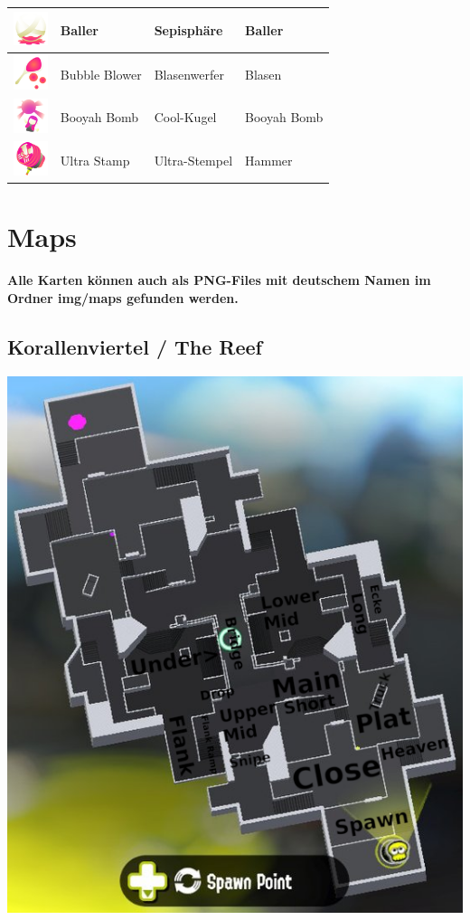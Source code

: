 \documentclass{scrreprt}
\begin{document}
\begin{center}
\begin{longtable}{|m{3.5cm}|m{4cm}|m{4cm}|m{2cm}|}
		\includegraphics[height=1cm]{img/baller.png} & Baller & Sepisphäre & Baller \\ \hline
		\includegraphics[height=1cm]{img/bubbleblower.png} & Bubble Blower & Blasenwerfer & Blasen \\ \hline
		\includegraphics[height=1cm]{img/booyahbomb.png} & Booyah Bomb & Cool-Kugel & Booyah Bomb \\ \hline
		\includegraphics[height=1cm]{img/ultrastamp.png} & Ultra Stamp & Ultra-Stempel & Hammer \\ \hline
	\end{longtable}
\end{center}
\chapter{Maps}
\textbf{Alle Karten können auch als PNG-Files mit deutschem Namen im Ordner img/maps gefunden werden.}
\section{Korallenviertel / The Reef}
\includegraphics[width=\linewidth]{img/thereef.png}
\end{document}

